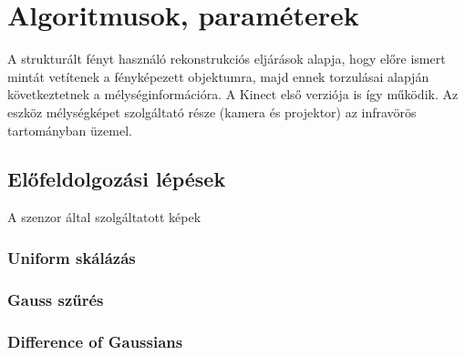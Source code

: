\chapter{Algoritmusok, paraméterek}\label{sect:AlgPar}

A strukturált fényt használó rekonstrukciós eljárások alapja, hogy előre ismert mintát vetítenek a fényképezett objektumra, majd ennek torzulásai alapján következtetnek a mélységinformációra.
A Kinect első verziója is így működik.
Az eszköz mélységképet szolgáltató része (kamera és projektor) az infravörös tartományban üzemel.


\section{Előfeldolgozási lépések}\label{sect:Preproc}

A szenzor által szolgáltatott képek 

\subsection{Uniform skálázás}\label{sect:scale}

\subsection{Gauss szűrés}\label{sect:gaussian}

\subsection{Difference of Gaussians}\label{sect:DoG}

